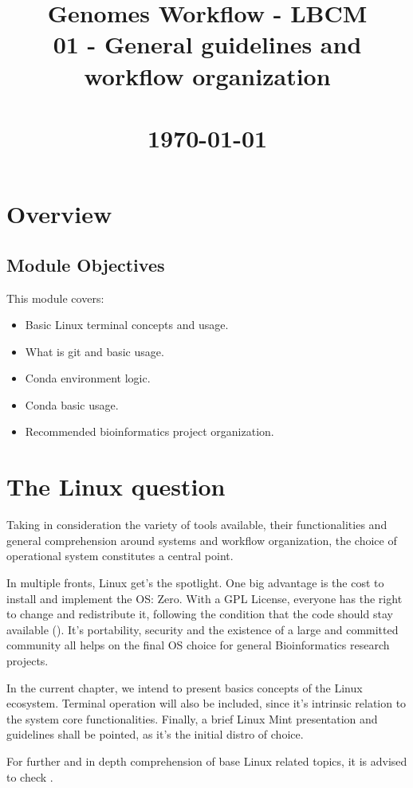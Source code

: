 \documentclass[a4paper,11pt]{article}
\title{
    \vfill
    \textcolor{noteblue}{\Huge Genomes Workflow - LBCM}\\
    \vspace{5.0cm}
    \textcolor{sidenotegray}{\huge 01 - General guidelines and workflow organization}\\
    \vspace{1.5cm}
    \textcolor{sidenotegray}{\LARGE }\\
    \vspace{5.0cm}
    \textcolor{sidenotegray}{\large \today}
    \vfill
}
\author{}
\date{}
\begin{document}
\maketitle
\thispagestyle{empty}
\newpage
\tableofcontents
\newpage
\section{Overview}

\subsection{Module Objectives}

This module covers:
\begin{itemize}
    \item Basic Linux terminal concepts and usage.
    \item What is git and basic usage.
    \item Conda environment logic.
    \item Conda basic usage.
    \item Recommended bioinformatics project organization.
\end{itemize}

\section{The Linux question}
Taking in consideration the variety of tools available, their functionalities
and general comprehension around systems and workflow organization, the choice
of operational system constitutes a central point. \par 
In multiple fronts, Linux get's the spotlight. One big advantage is the cost to
install and implement the OS: Zero. With a GPL License, everyone has the right
to change and redistribute it, following the condition that the code should stay
available (\cite{garrelsIntroductionLinux2008}). It's portability, security and
the existence of a large and committed community all helps on the final OS
choice for general Bioinformatics research projects.\par
In the current chapter, we intend to present basics concepts of the Linux
ecosystem. Terminal operation will also be included, since it's intrinsic
relation to the system core functionalities. Finally, a brief Linux Mint
presentation and guidelines shall be pointed, as it's the initial distro of
choice.\par
\begin{remarkbox}
    For further and in depth comprehension of base Linux related topics, it is
    advised to check \cite{garrelsIntroductionLinux2008}.
\end{remarkbox}
\end{document}
